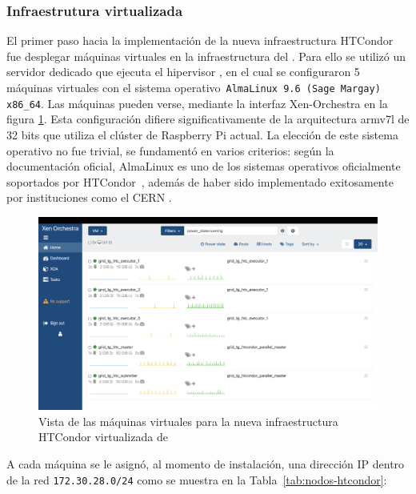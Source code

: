 \FloatBarrier\subsubsection{Infraestrutura virtualizada}

El primer paso hacia la implementación de la nueva infraestructura HTCondor fue desplegar máquinas virtuales en la infraestructura del \GRID. Para ello se utilizó un servidor dedicado que ejecuta el hipervisor \cite{xcpng_intro}, en el cual se configuraron 5 máquinas virtuales con el sistema operativo~\texttt{AlmaLinux 9.6 (Sage Margay) x86\_64}. Las máquinas pueden verse, mediante la interfaz Xen-Orchestra en la figura \ref{fig:xen-vms}. Esta configuración difiere significativamente de la arquitectura armv7l de 32 bits que utiliza el clúster de Raspberry Pi actual. La elección de este sistema operativo no fue trivial, se fundamentó en varios criterios: según la documentación oficial, AlmaLinux es uno de los sistemas operativos oficialmente soportados por HTCondor~\cite{HTCondor_install}, además de haber sido implementado exitosamente por instituciones como el CERN \citep{Bunsic2025}.

\begin{figure}
	\centering
	\includegraphics[scale=0.25]{apendices/infra-virtual/xen-vms.png}
	\caption{Vista de las máquinas virtuales para la nueva infraestructura HTCondor virtualizada de \GRID}
	\label{fig:xen-vms}
\end{figure}

A cada máquina se le asignó, al momento de instalación, una dirección IP dentro de la red \texttt{172.30.28.0/24} como se muestra en la Tabla~\ref{tab:nodos-htcondor}:

